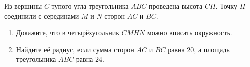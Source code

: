 \begin{ex}
	\begin{condition}
		Из вершины \( C  \) тупого угла треугольника \( ABC  \) проведена высота \( CH \). Точку \( H  \) соединили с серединами \( M  \) и \( N  \) сторон \( AC  \) и \( BC \).
		\begin{enumerate}
			\item Докажите, что в четырёхугольник \( CMHN  \) можно вписать окружность.
			\item Найдите её радиус, если сумма сторон \( AC  \) и \( BC  \) равна \( 20 \), а площадь треугольника \( ABC  \) равна \( 24 \).
		\end{enumerate}
	\end{condition}
\end{ex}